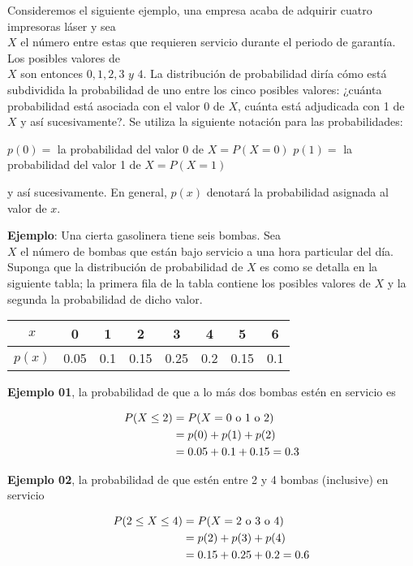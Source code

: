 \documentclass[
]{book}
\begin{document}
Consideremos el siguiente ejemplo, una empresa acaba de adquirir cuatro impresoras láser y sea\\
\(X\) el número entre estas que requieren servicio durante el periodo de garantía. Los posibles valores de\\
\(X\) son entonces \(0, 1, 2, 3 \,\, y\,\, 4\). La distribución de probabilidad diría cómo está subdividida la probabilidad de uno entre los cinco posibles valores: ¿cuánta probabilidad está asociada con el valor 0 de \(X\), cuánta está adjudicada con 1 de \(X\) y así sucesivamente?. Se utiliza la siguiente notación para las probabilidades:

\(p(0) =\) la probabilidad del valor 0 de \(X = P(X=0)\)
\(p(1) =\) la probabilidad del valor 1 de \(X = P(X=1)\)

y así sucesivamente. En general, \(p(x)\) denotará la probabilidad asignada al valor de \(x\).

\textbf{Ejemplo}: Una cierta gasolinera tiene seis bombas. Sea\\
\(X\) el número de bombas que están bajo servicio a una hora particular del día. Suponga que la distribución de probabilidad de \(X\) es como se detalla en la siguiente tabla; la primera fila de la tabla contiene los posibles valores de \(X\) y la segunda la probabilidad de dicho valor.

\begin{longtable}[]{@{}cccccccc@{}}
\toprule\noalign{}
\(x\) & 0 & 1 & 2 & 3 & 4 & 5 & 6 \\
\midrule\noalign{}
\endhead
\bottomrule\noalign{}
\endlastfoot
\(p(x)\) & 0.05 & 0.1 & 0.15 & 0.25 & 0.2 & 0.15 & 0.1 \\
\end{longtable}

\textbf{Ejemplo 01}, la probabilidad de que a lo más dos bombas estén en servicio es

\begin{equation}
  \notag
  \begin{split}
    P(X\leq 2) &= P(X = 0 \text{ o } 1 \text{ o } 2) \\
    & = p(0) + p(1) + p(2) \\
    & = 0.05 + 0.1 + 0.15 = 0.3
  \end{split}
\end{equation}

\textbf{Ejemplo 02}, la probabilidad de que estén entre 2 y 4 bombas (inclusive) en servicio

\begin{equation}
  \notag
  \begin{split}
    P(2\leq X\leq 4) &= P(X = 2 \text{ o } 3 \text{ o } 4)\\
    & = p(2) + p(3) + p(4) \\
    & = 0.15 + 0.25 + 0.2 = 0.6
  \end{split}
\end{equation}
\end{document}
